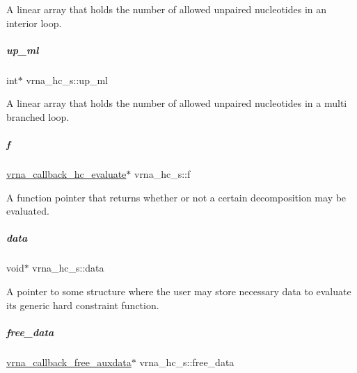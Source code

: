 A linear array that holds the number of allowed unpaired nucleotides in an interior loop. 

\mbox{\label{group__hard__constraints_aa318079c2e3cfaca8dc589cc478d3b29}} 
\subparagraph{\texorpdfstring{up\+\_\+ml}{up\_ml}}
{\footnotesize\ttfamily int$\ast$ vrna\+\_\+hc\+\_\+s\+::up\+\_\+ml}



A linear array that holds the number of allowed unpaired nucleotides in a multi branched loop. 

\mbox{\label{group__hard__constraints_a85714afbf27012165ec80c564bd62931}} 
\subparagraph{\texorpdfstring{f}{f}}
{\footnotesize\ttfamily \mbox{\hyperlink{group__hard__constraints_gae465f1d4a3d8b6592b38ecbb0d9f613d}{vrna\+\_\+callback\+\_\+hc\+\_\+evaluate}}$\ast$ vrna\+\_\+hc\+\_\+s\+::f}



A function pointer that returns whether or not a certain decomposition may be evaluated. 

\mbox{\label{group__hard__constraints_acef3d722142cb5f4a8e114e5fbce3b1a}} 
\subparagraph{\texorpdfstring{data}{data}}
{\footnotesize\ttfamily void$\ast$ vrna\+\_\+hc\+\_\+s\+::data}



A pointer to some structure where the user may store necessary data to evaluate its generic hard constraint function. 

\mbox{\label{group__hard__constraints_a970e0e202c9e46ebc7640ddc43357ba6}} 
\subparagraph{\texorpdfstring{free\+\_\+data}{free\_data}}
{\footnotesize\ttfamily \mbox{\hyperlink{group__fold__compound_ga7806651f51b195013839a218b3bbd5a3}{vrna\+\_\+callback\+\_\+free\+\_\+auxdata}}$\ast$ vrna\+\_\+hc\+\_\+s\+::free\+\_\+data}



